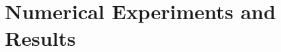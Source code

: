\documentclass[a4paper,10pt,3p,preprint,pdftex]{elsarticle}
\begin{document}








%
\section{Numerical Experiments and Results}
\label{sec:results}
\end{document}
